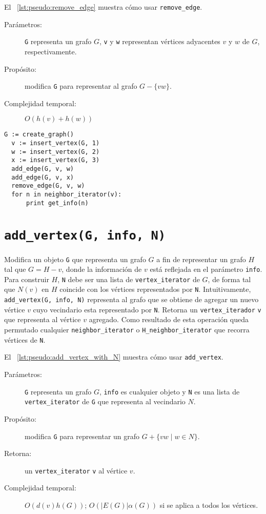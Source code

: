 \documentclass[%
    a4paper,%
    fontsize=12pt,%
    DIV=12,
    twoside,%
    openright,%
    titlepage=true,%
    headsepline,%
    toc=bibliography,%
    parskip=half,%
    cleardoublepage=empty,%
    headings=big,%
]{scrbook}
\makeatletter
\newcommand{\Code}[2][]{\lstinline[basicstyle={\ttfamily},#1]@#2@}
\makeatother
\begin{document}
El \lstlistingname~\ref{lst:pseudo:remove_edge} muestra cómo usar \Code{remove_edge}.

\begin{description}
  \item [Parámetros:] \Code{G} representa un grafo $G$, \Code{v} y \Code{w} representan vértices adyacentes $v$ y $w$ de $G$, respectivamente.
  \item [Propósito:] modifica \Code{G} para representar al grafo $G - \{vw\}$.
  \item [Complejidad temporal:] $O(h(v) + h(w))$
\end{description}


\begin{lstlisting}[caption={Ejemplo de uso de \Code{remove_edge} para imprimir $3$.  Ver Sección~\ref{sec:tad grafo:neighbor-iterator} para más información de \Code{neghbor_iterator}.},gobble=2,float=ht,label={lst:pseudo:remove_edge},emph={remove_edge}]
  G := create_graph()
  v := insert_vertex(G, 1)
  w := insert_vertex(G, 2)
  x := insert_vertex(G, 3)
  add_edge(G, v, w)
  add_edge(G, v, x)
  remove_edge(G, v, w)
  for n in neighbor_iterator(v):
      print get_info(n)
\end{lstlisting}


\section{\texorpdfstring{\Code{add_vertex(G, info, N)}}{add\_vertex(G, info, N)}}
\label{sec:tad grafo:add-vertex}

Modifica un objeto \Code{G} que representa un grafo $G$ a fin de representar un grafo $H$ tal que $G = H - v$, donde la información de $v$ está reflejada en el parámetro \Code{info}.  Para construir $H$, \Code{N} debe ser una lista de \Code{vertex_iterator} de $G$, de forma tal que $N(v)$ en $H$ coincide con los vértices representados por \Code{N}.   Intuitivamente, \Code{add_vertex(G, info, N)} representa al grafo que se obtiene de agregar un nuevo vértice $v$ cuyo vecindario esta representado por \Code{N}.  Retorna un \Code{vertex_iterador} \Code{v} que representa al vértice $v$ agregado.  Como resultado de esta operación queda permutado cualquier \Code{neighbor_iterator} o \Code{H_neighbor_iterator} que recorra vértices de \Code{N}.

El \lstlistingname~\ref{lst:pseudo:add_vertex_with_N} muestra cómo usar \Code{add_vertex}.

\begin{description}
  \item [Parámetros:] \Code{G} representa un grafo $G$, \Code{info} es cualquier objeto y \Code{N} es una lista de \Code{vertex_iterator} de \Code{G} que representa al vecindario $N$.
  \item [Propósito:] modifica \Code{G} para representar un grafo $G + \{vw \mid w \in N\}$.
  \item [Retorna:] un \Code{vertex_iterator} \Code{v} al vértice $v$.
  \item [Complejidad temporal:] $O(d(v)h(G))$; $O(|E(G)|\alpha(G))$ si se aplica a todos los vértices.
\end{description}
\end{document}
